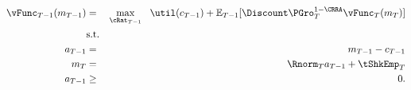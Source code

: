 \begin{eqnarray*}
{\vFunc}_{T-1}({m}_{T-1}) & = & \max_{\cRat_{T-1}} ~~ \util({c}_{T-1}) + \Ex_{T-1} [\Discount \PGro_{T}^{1-\CRRA}{\vFunc}_{T}({m}_{T})] \label{eq:ConstrArt}
\\ & \mbox{s.t.}&   
\\ {a}_{T-1} & = & {m}_{T-1} - {c}_{T-1}
\\ {m}_{T} & = & \Rnorm_{T} {a}_{T-1} + \tShkEmp_{T}
\\ {a}_{T-1} & \geq & 0 .
\end{eqnarray*}
